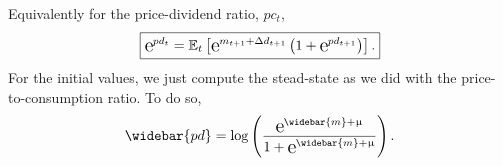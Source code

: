 	Equivalently for the price-dividend ratio, $pc_t$,
\begin{equation}
	\boxed{\e{pd_t} = \E_t\left[\e{m_{t+1}+\Delta d_{t+1}}\left(1+\e{pd_{t+1}}\right)\right].}
\end{equation}
For the initial values, we just compute the stead-state as we did with the price-to-consumption ratio. To do so,
\begin{equation}
	\widebar{pd} = \log\left(\frac{\e{\widebar{m}+\mu}}{1+\e{\widebar{m}+\mu}}\right).
\end{equation}